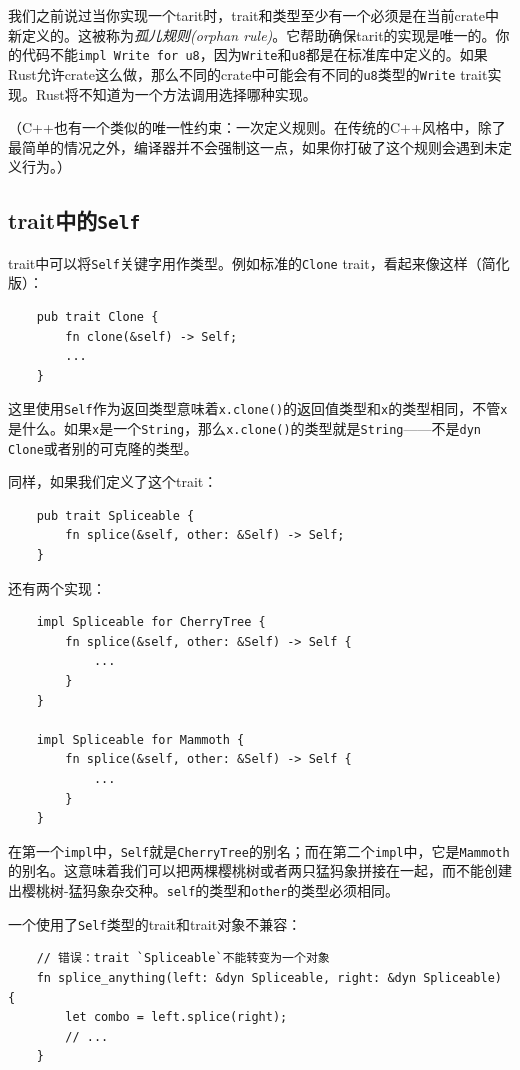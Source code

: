 我们之前说过当你实现一个tarit时，trait和类型至少有一个必须是在当前crate中新定义的。这被称为\emph{孤儿规则(orphan rule)}。它帮助确保tarit的实现是唯一的。你的代码不能\texttt{impl Write for u8}，因为\texttt{Write}和\texttt{u8}都是在标准库中定义的。如果Rust允许crate这么做，那么不同的crate中可能会有不同的\texttt{u8}类型的\texttt{Write} trait实现。Rust将不知道为一个方法调用选择哪种实现。

（C++也有一个类似的唯一性约束：一次定义规则。在传统的C++风格中，除了最简单的情况之外，编译器并不会强制这一点，如果你打破了这个规则会遇到未定义行为。）

\subsection{trait中的\texttt{Self}}
trait中可以将\texttt{Self}关键字用作类型。例如标准的\texttt{Clone} trait，看起来像这样（简化版）：
\begin{verbatim}
    pub trait Clone {
        fn clone(&self) -> Self;
        ...
    }
\end{verbatim}

这里使用\texttt{Self}作为返回类型意味着\texttt{x.clone()}的返回值类型和\texttt{x}的类型相同，不管\texttt{x}是什么。如果\texttt{x}是一个\texttt{String}，那么\texttt{x.clone()}的类型就是\texttt{String}——不是\texttt{dyn Clone}或者别的可克隆的类型。

同样，如果我们定义了这个trait：
\begin{verbatim}
    pub trait Spliceable {
        fn splice(&self, other: &Self) -> Self;
    }
\end{verbatim}
还有两个实现：
\begin{verbatim}
    impl Spliceable for CherryTree {
        fn splice(&self, other: &Self) -> Self {
            ...
        }
    }

    impl Spliceable for Mammoth {
        fn splice(&self, other: &Self) -> Self {
            ...
        }
    }    
\end{verbatim}

在第一个\texttt{impl}中，\texttt{Self}就是\texttt{CherryTree}的别名；而在第二个\texttt{impl}中，它是\texttt{Mammoth}的别名。这意味着我们可以把两棵樱桃树或者两只猛犸象拼接在一起，而不能创建出樱桃树-猛犸象杂交种。\texttt{self}的类型和\texttt{other}的类型必须相同。

一个使用了\texttt{Self}类型的trait和trait对象不兼容：
\begin{verbatim}
    // 错误：trait `Spliceable`不能转变为一个对象
    fn splice_anything(left: &dyn Spliceable, right: &dyn Spliceable) {
        let combo = left.splice(right);
        // ...
    }
\end{verbatim}

